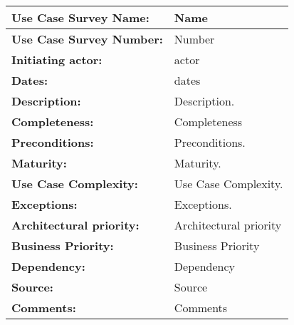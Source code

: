 \begin{tabularx}{\linewidth}{|l|X|}
\hline
\textbf{Use Case Survey Name:} & \textbf{Name} \\
\hline
\textbf{Use Case Survey Number:} & Number \\
\hline
\textbf{Initiating actor:} & actor \\
\hline
\textbf{Dates:} & dates \\
\hline
\textbf{Description:} & Description. \\
\hline
\textbf{Completeness:} & Completeness \\
\hline
\textbf{Preconditions:} & Preconditions. \\
\hline
\textbf{Maturity:} & Maturity. \\
\hline
\textbf{Use Case Complexity:} & Use Case Complexity. \\
\hline 
\textbf{Exceptions:} & Exceptions. \\
\hline
\textbf{Architectural priority:} & Architectural priority \\
\hline
\textbf{Business Priority:} & Business Priority \\
\hline 
\textbf{Dependency:} & Dependency \\
\hline
\textbf{Source:} & Source \\
\hline
\textbf{Comments:} & Comments \\
\hline
\end{tabularx}


 